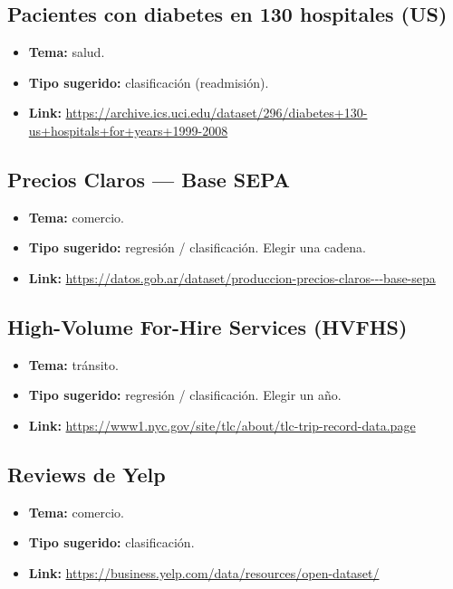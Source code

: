 \documentclass[12pt]{article}
\begin{document}
\subsection{Pacientes con diabetes en 130 hospitales (US)}
\begin{itemize}
    \item \textbf{Tema:} salud.
    \item \textbf{Tipo sugerido:} clasificación (readmisión).
    \item \textbf{Link:} \url{https://archive.ics.uci.edu/dataset/296/diabetes+130-us+hospitals+for+years+1999-2008}
\end{itemize}

\subsection{Precios Claros --- Base SEPA}
\begin{itemize}
    \item \textbf{Tema:} comercio.
    \item \textbf{Tipo sugerido:} regresión / clasificación. Elegir una cadena.
    \item \textbf{Link:} \url{https://datos.gob.ar/dataset/produccion-precios-claros---base-sepa}
\end{itemize}

\subsection{High-Volume For-Hire Services (HVFHS)}
\begin{itemize}
    \item \textbf{Tema:} tránsito.
    \item \textbf{Tipo sugerido:} regresión / clasificación. Elegir un año.
    \item \textbf{Link:} \url{https://www1.nyc.gov/site/tlc/about/tlc-trip-record-data.page}
\end{itemize}

\subsection{Reviews de Yelp}
\begin{itemize}
    \item \textbf{Tema:} comercio.
    \item \textbf{Tipo sugerido:} clasificación.
    \item \textbf{Link:} \url{https://business.yelp.com/data/resources/open-dataset/}
\end{itemize}
\end{document}

